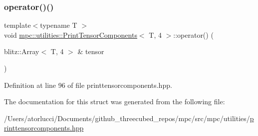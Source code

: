 \subsubsection{\texorpdfstring{operator()()}{operator()()}}
{\footnotesize\ttfamily template$<$typename T $>$ \\
void \mbox{\hyperlink{structmpc_1_1utilities_1_1_print_tensor_components}{mpc\+::utilities\+::\+Print\+Tensor\+Components}}$<$ T, 4 $>$\+::operator() (\begin{DoxyParamCaption}\item[{blitz\+::\+Array$<$ T, 4 $>$ \&}]{tensor }\end{DoxyParamCaption})\hspace{0.3cm}{\ttfamily [inline]}}



Definition at line 96 of file printtensorcomponents.\+hpp.



The documentation for this struct was generated from the following file\+:\begin{DoxyCompactItemize}
\item 
/\+Users/atorlucci/\+Documents/github\+\_\+threecubed\+\_\+repos/mpc/src/mpc/utilities/\mbox{\hyperlink{printtensorcomponents_8hpp}{printtensorcomponents.\+hpp}}\end{DoxyCompactItemize}
